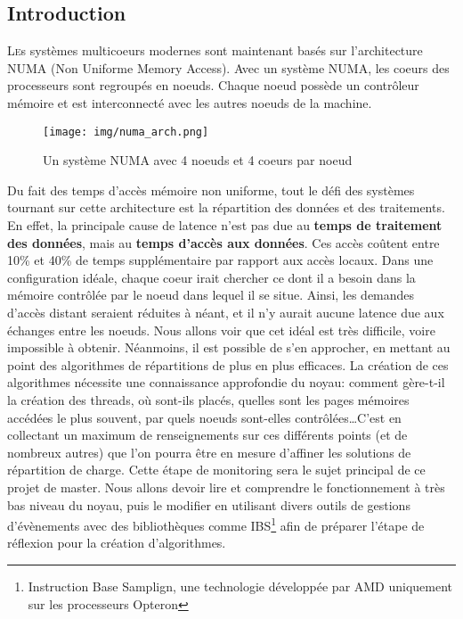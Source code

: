 \subsection{Introduction}

  \lettrine[nindent=0em,lines=3]{L} es systèmes multicoeurs modernes sont
  maintenant basés sur l'architecture NUMA (Non Uniforme Memory Access). Avec un
  système NUMA, les coeurs des processeurs sont regroupés en noeuds. Chaque
  noeud possède un contrôleur mémoire et est interconnecté avec les autres
  noeuds de la machine.

  \begin{figure}[H]
    \texttt{[image: img/numa\_arch.png]}
    \caption{Un système NUMA avec 4 noeuds et 4 coeurs par noeud}
    \label{f:numa_arch}
  \end{figure}

  Du fait des temps d'accès mémoire non uniforme, tout le défi des systèmes
  tournant sur cette architecture est la répartition des données et des
  traitements. En effet, la principale cause de latence n'est pas due au
  \textbf{temps de traitement des données}, mais au \textbf{temps d'accès aux
    données}. Ces accès coûtent entre 10\% et 40\% de temps supplémentaire par
  rapport aux accès locaux.\cite{Lepers2014} Dans une configuration idéale,
  chaque coeur irait chercher ce dont il a besoin dans la mémoire contrôlée par
  le noeud dans lequel il se situe. Ainsi, les demandes d'accès distant seraient
  réduites à néant, et il n'y aurait aucune latence due aux échanges entre les
  noeuds. Nous allons voir que cet idéal est très difficile, voire impossible à
  obtenir. Néanmoins, il est possible de s'en approcher, en mettant au point des
  algorithmes de répartitions de plus en plus efficaces. La création de ces
  algorithmes nécessite une connaissance approfondie du noyau: comment gère-t-il
  la création des threads, où sont-ils placés, quelles sont les pages mémoires
  accédées le plus souvent, par quels noeuds sont-elles contrôlées\ldots C'est
  en collectant un maximum de renseignements sur ces différents points (et de
  nombreux autres) que l'on pourra être en mesure d'affiner les solutions de
  répartition de charge. Cette étape de monitoring sera le sujet principal de ce
  projet de master. Nous allons devoir lire et comprendre le fonctionnement à
  très bas niveau du noyau, puis le modifier en utilisant divers outils de
  gestions d'évènements avec des bibliothèques comme IBS\footnote{Instruction
    Base Samplign, une technologie développée par AMD uniquement sur les
    processeurs Opteron} afin de préparer l'étape de réflexion pour la création
  d'algorithmes.
